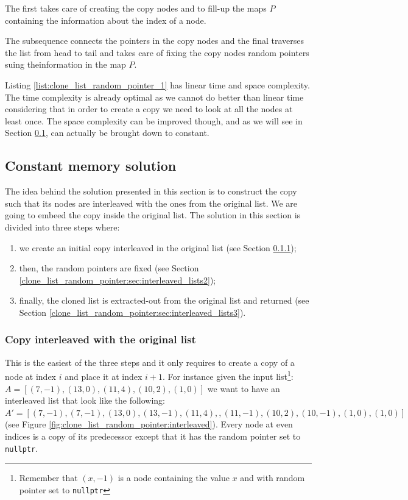 

The first  takes care of creating the copy nodes and to fill-up the maps $P$ containing the information about the index of a node.

The subsequence  connects the  pointers in the copy nodes and the final  traverses the list from head to tail and takes care of fixing the copy nodes random pointers suing theinformation in the map $P$.

Listing \ref{list:clone_list_random_pointer_1}  has linear time and space  complexity. 
The time complexity is already optimal as we cannot do better than linear time considering that in order to create a copy we need to look at all the nodes at least once. The space complexity can be improved though, and as we will see in Section \ref{clone_list_random_pointer:sec:interleaved_lists},   can actually be brought down to constant.


\subsection{Constant memory solution}
\label{clone_list_random_pointer:sec:interleaved_lists}
The idea behind the solution presented in this section is to construct the copy such that its nodes are interleaved with the ones from the original list. We are going to embeed the copy inside the original list.
The solution in this section is divided into three steps where:
\begin{enumerate}
	\item we create an initial copy interleaved in the original list (see Section \ref{clone_list_random_pointer:sec:interleaved_lists1});
	\item then, the random pointers are fixed (see Section  \ref{clone_list_random_pointer:sec:interleaved_lists2});
	\item finally, the cloned list is extracted-out from the original list and returned (see Section  \ref{clone_list_random_pointer:sec:interleaved_lists3}).
\end{enumerate}

\subsubsection{Copy interleaved with the original list}
\label{clone_list_random_pointer:sec:interleaved_lists1}
This is the easiest of the three steps and it only requires to create a copy of a node at index $i$ and place it at index $i+1$. 
For instance given the input list\footnote{Remember that $(x,-1)$ is a node containing the value $x$ and with random pointer set to \lstinline[columns=fixed]{nullptr}}: $A = [(7,-1),(13,0),(11,4),(10,2),(1,0)]$ we want to have an interleaved list that look like the following: $A' = [(7,-1),(7,-1),(13,0),(13,-1),(11,4),,(11,-1),(10,2),(10,-1),(1,0),(1,0)]$ (see Figure \ref{fig:clone_list_random_pointer:interleaved}).
Every node at even indices is a copy of its predecessor except that it has the random pointer set to \lstinline[columns=fixed]{nullptr}.

